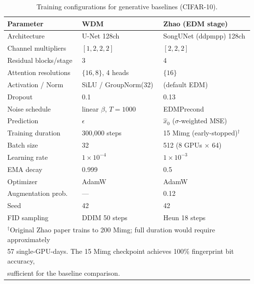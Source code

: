 \documentclass{article}
\begin{document}
\begin{table}[!htbp]
\caption{Training configurations for generative baselines (CIFAR-10).}
\label{tab:baseline_training}
\centering
\begin{small}
\begin{tabular}{@{}lll@{}}
\toprule
Parameter & WDM & Zhao (EDM stage) \\
\midrule
Architecture            & U-Net 128ch                & SongUNet (ddpmpp) 128ch \\
Channel multipliers     & $[1,2,2,2]$                & $[2,2,2]$ \\
Residual blocks/stage   & 3                          & 4 \\
Attention resolutions   & $\{16, 8\}$, 4 heads       & $\{16\}$ \\
Activation / Norm       & SiLU / GroupNorm(32)       & (default EDM) \\
Dropout                 & 0.1                        & 0.13 \\
Noise schedule          & linear $\beta$, $T{=}1000$ & EDMPrecond \\
Prediction              & $\epsilon$                 & $\hat{x}_0$ ($\sigma$-weighted MSE) \\
Training duration       & 300{,}000 steps            & 15 Mimg (early-stopped)$^\dagger$ \\
Batch size              & 32                         & 512 (8 GPUs $\times$ 64) \\
Learning rate           & $1{\times}10^{-4}$         & $1{\times}10^{-3}$ \\
EMA decay               & 0.999                      & 0.5 \\
Optimizer               & AdamW                      & AdamW \\
Augmentation prob.      & ---                        & 0.12 \\
Seed                    & 42                         & 42 \\
FID sampling            & DDIM 50 steps              & Heun 18 steps \\
\bottomrule
\multicolumn{3}{l}{\footnotesize $^\dagger$Original Zhao paper trains to 200 Mimg; full duration would require approximately} \\
\multicolumn{3}{l}{\footnotesize 57 single-GPU-days. The 15 Mimg checkpoint achieves 100\% fingerprint bit accuracy,} \\
\multicolumn{3}{l}{\footnotesize sufficient for the baseline comparison.} \\
\end{tabular}
\end{small}
\end{table}
\end{document}
